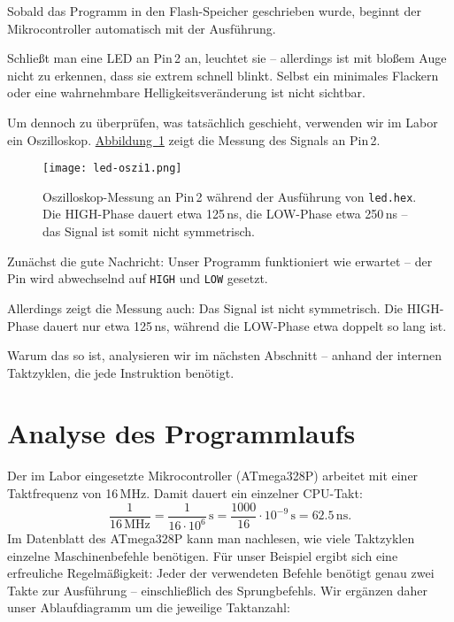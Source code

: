 \documentclass[a4paper,12pt]{article}
\begin{document}
Sobald das Programm in den Flash-Speicher geschrieben wurde, beginnt der
Mikrocontroller automatisch mit der Ausführung.

Schließt man eine LED an Pin 2 an, leuchtet sie – allerdings ist mit bloßem
Auge nicht zu erkennen, dass sie extrem schnell blinkt. Selbst ein minimales
Flackern oder eine wahrnehmbare Helligkeitsveränderung ist nicht sichtbar. 

Um dennoch zu überprüfen, was tatsächlich geschieht, verwenden wir im Labor ein
Oszilloskop. \hyperref[fig:led-oszi1]{Abbildung~\ref{fig:led-oszi1}} zeigt die
Messung des Signals an Pin 2.

\begin{figure}[ht]
    \centering
    \texttt{[image: led-oszi1.png]}
    \caption{
	Oszilloskop-Messung an Pin 2 während der Ausführung von
	\texttt{led.hex}.  Die HIGH-Phase dauert etwa 125 ns, die LOW-Phase
	etwa 250 ns – das Signal ist somit nicht symmetrisch.
    }
    \label{fig:led-oszi1}
\end{figure}

\noindent
Zunächst die gute Nachricht: Unser Programm funktioniert wie erwartet – der Pin
wird abwechselnd auf \texttt{HIGH} und \texttt{LOW} gesetzt.

Allerdings zeigt die Messung auch: Das Signal ist nicht symmetrisch. Die
HIGH-Phase dauert nur etwa 125 ns, während die LOW-Phase etwa doppelt so lang
ist. 

Warum das so ist, analysieren wir im nächsten Abschnitt – anhand der internen
Taktzyklen, die jede Instruktion benötigt.

\newpage
\section{Analyse des Programmlaufs}

Der im Labor eingesetzte Mikrocontroller (ATmega328P) arbeitet mit einer
Taktfrequenz von 16 MHz. Damit dauert ein einzelner CPU-Takt:
\[
    \frac{1}{16\,\text{MHz}} = \frac{1}{16 \cdot 10^6}\,\text{s}
    = \frac{1000}{16} \cdot 10^{-9}\,\text{s} = 62.5\,\text{ns}.
\]
Im Datenblatt des ATmega328P kann man nachlesen, wie viele Taktzyklen einzelne
Maschinenbefehle benötigen. Für unser Beispiel ergibt sich eine erfreuliche
Regelmäßigkeit: Jeder der verwendeten Befehle benötigt genau zwei Takte zur
Ausführung – einschließlich des Sprungbefehls.
Wir ergänzen daher unser Ablaufdiagramm um die jeweilige Taktanzahl:
\end{document}
